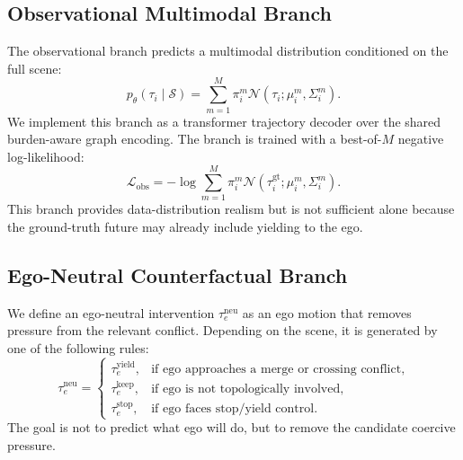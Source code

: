 \documentclass[10pt]{article}
\begin{document}
\subsection{Observational Multimodal Branch}
\label{app:obs_branch}

The observational branch predicts a multimodal distribution conditioned on the full scene:
\begin{equation}
    p_\theta(\tau_i \mid \mathcal{S})
    =
    \sum_{m=1}^{M}
    \pi^m_i
    \mathcal{N}
    \left(
    \tau_i;
    \mu^m_i,
    \Sigma^m_i
    \right).
\end{equation}
We implement this branch as a transformer trajectory decoder over the shared burden-aware graph encoding. The branch is trained with a best-of-$M$ negative log-likelihood:
\begin{equation}
    \mathcal{L}_{\mathrm{obs}}
    =
    -\log
    \sum_{m=1}^{M}
    \pi^m_i
    \mathcal{N}
    \left(
    \tau^{\mathrm{gt}}_i;
    \mu^m_i,
    \Sigma^m_i
    \right).
\end{equation}
This branch provides data-distribution realism but is not sufficient alone because the ground-truth future may already include yielding to the ego.

\subsection{Ego-Neutral Counterfactual Branch}
\label{app:neutral_branch}

We define an ego-neutral intervention $\tau^{\mathrm{neu}}_e$ as an ego motion that removes pressure from the relevant conflict. Depending on the scene, it is generated by one of the following rules:
\begin{equation}
    \tau^{\mathrm{neu}}_e
    =
    \begin{cases}
        \tau^{\mathrm{yield}}_e, & \text{if ego approaches a merge or crossing conflict},\\
        \tau^{\mathrm{keep}}_e, & \text{if ego is not topologically involved},\\
        \tau^{\mathrm{stop}}_e, & \text{if ego faces stop/yield control}.
    \end{cases}
\end{equation}
The goal is not to predict what ego will do, but to remove the candidate coercive pressure.
\end{document}
